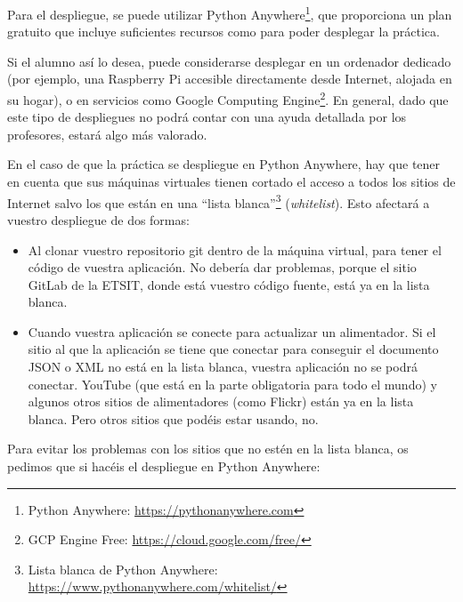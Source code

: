 Para el despliegue, se puede utilizar Python Anywhere\footnote{Python Anywhere: \url{https://pythonanywhere.com}}, que proporciona un plan gratuito que incluye suficientes recursos como para poder desplegar la práctica.

Si el alumno así lo desea, puede considerarse desplegar en un ordenador dedicado (por ejemplo, una Raspberry Pi accesible directamente desde Internet, alojada en su hogar), o en servicios como Google Computing Engine\footnote{GCP Engine Free: \url{https://cloud.google.com/free/}}. En general, dado que este tipo de despliegues no podrá contar con una ayuda detallada por los profesores, estará algo más valorado.

En el caso de que la práctica se despliegue en Python Anywhere, hay que tener en cuenta que sus máquinas virtuales tienen cortado el acceso a todos los sitios de Internet salvo los que están en una ``lista blanca''\footnote{Lista blanca de Python Anywhere: \url{https://www.pythonanywhere.com/whitelist/}} (\emph{whitelist}). Esto afectará a vuestro despliegue de dos formas:

\begin{itemize}
\item Al clonar vuestro repositorio git dentro de la máquina virtual, para tener el código de vuestra aplicación. No debería dar problemas, porque el sitio GitLab de la ETSIT, donde está vuestro código fuente, está ya en la lista blanca.
\item Cuando vuestra aplicación se conecte para actualizar un alimentador. Si el sitio al que la aplicación se tiene que conectar para conseguir el documento JSON o XML no está en la lista blanca, vuestra aplicación no se podrá conectar. YouTube (que está en la parte obligatoria para todo el mundo) y algunos otros sitios de alimentadores (como Flickr) están ya en la lista blanca. Pero otros sitios que podéis estar usando, no.
\end{itemize}

Para evitar los problemas con los sitios que no estén en la lista blanca, os pedimos que si hacéis el despliegue en Python Anywhere:

